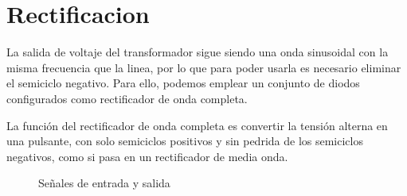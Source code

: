 \documentclass[chaptersright]{informeutn}
\begin{document}
      \section{Rectificacion}
        La salida de voltaje del transformador sigue siendo una onda sinusoidal con la misma frecuencia que la linea,
        por lo que para poder usarla es necesario eliminar el semiciclo negativo. Para ello, podemos emplear un
        conjunto de diodos configurados como rectificador de onda completa.

        La función del rectificador de onda completa es convertir la tensión alterna en una pulsante, con solo
        semiciclos positivos y sin pedrida de los semiciclos negativos, como si pasa en un rectificador de media
        onda.
        \begin{figure}[!h]
          \noindent
          \centering
          \begin{minipage}[t][5cm][c]{0.4\textwidth}
            \centering
          \end{minipage}
          \begin{minipage}[t][5cm][c]{0.4\textwidth}
            \centering
          \end{minipage}
          \caption{Señales de entrada y salida}
        \end{figure}
\end{document}
